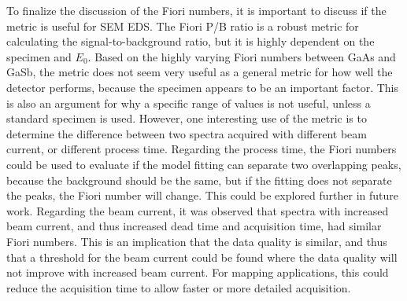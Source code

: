 To finalize the discussion of the Fiori numbers, it is important to discuss if the metric is useful for SEM EDS.
The Fiori P/B ratio is a robust metric for calculating the signal-to-background ratio, but it is highly dependent on the specimen and $E_0$.
Based on the highly varying Fiori numbers between GaAs and GaSb, the metric does not seem very useful as a general metric for how well the detector performs, because the specimen appears to be an important factor.
This is also an argument for why a specific range of values is not useful, unless a standard specimen is used.
However, one interesting use of the metric is to determine the difference between two spectra acquired with different beam current, or different process time.
Regarding the process time, the Fiori numbers could be used to evaluate if the model fitting can separate two overlapping peaks, because the background should be the same, but if the fitting does not separate the peaks, the Fiori number will change.
This could be explored further in future work.
Regarding the beam current, it was observed that spectra with increased beam current, and thus increased dead time and acquisition time, had similar Fiori numbers.
This is an implication that the data quality is similar, and thus that a threshold for the beam current could be found where the data quality will not improve with increased beam current.
For mapping applications, this could reduce the acquisition time to allow faster or more detailed acquisition.





